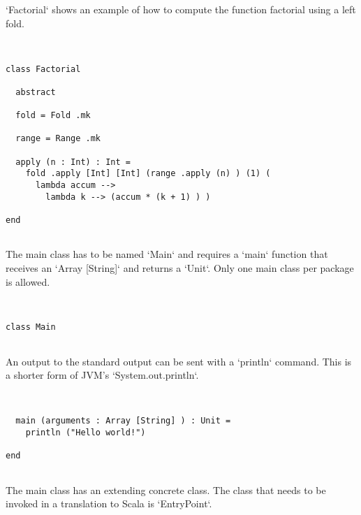 \documentclass[12pt,a4paper]{article}
\begin{document}
`Factorial` shows an example of how to compute the function factorial using a left fold.


\begin{lstlisting}


class Factorial

  abstract

  fold = Fold .mk

  range = Range .mk

  apply (n : Int) : Int =
    fold .apply [Int] [Int] (range .apply (n) ) (1) (
      lambda accum -->
        lambda k --> (accum * (k + 1) ) )

end


\end{lstlisting}

The main class has to be named `Main` and requires a `main` function that receives an
 `Array [String]` and returns a `Unit`. Only one main class per package is allowed.


\begin{lstlisting}


class Main


\end{lstlisting}

  An output to the standard output can be sent with a `println` command.
   This is a shorter form of JVM's `System.out.println`.


\begin{lstlisting}


  main (arguments : Array [String] ) : Unit =
    println ("Hello world!")

end


\end{lstlisting}

The main class has an extending concrete class. The class that needs to be invoked in a
 translation to Scala is `EntryPoint`.


\begin{lstlisting}


\end{lstlisting}
\end{document}
